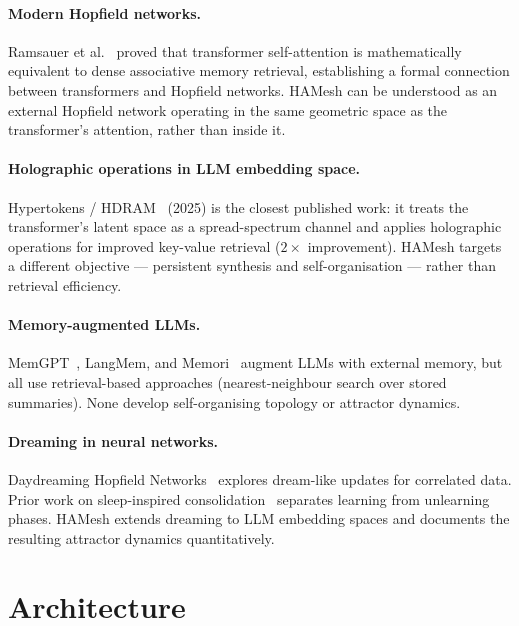 \documentclass[11pt]{article}
\begin{document}
\paragraph{Modern Hopfield networks.}
Ramsauer et al.~\cite{ramsauer2020} proved that transformer self-attention is
mathematically equivalent to dense associative memory retrieval, establishing a
formal connection between transformers and Hopfield networks. HAMesh can be
understood as an external Hopfield network operating in the same geometric space
as the transformer's attention, rather than inside it.

\paragraph{Holographic operations in LLM embedding space.}
Hypertokens / HDRAM~\cite{augeri2025} (2025) is the closest published work: it
treats the transformer's latent space as a spread-spectrum channel and applies
holographic operations for improved key-value retrieval ($2\times$ improvement).
HAMesh targets a different objective --- persistent synthesis and
self-organisation --- rather than retrieval efficiency.

\paragraph{Memory-augmented LLMs.}
MemGPT~\cite{packer2023}, LangMem, and Memori~\cite{borro2026} augment LLMs
with external memory, but all use retrieval-based approaches (nearest-neighbour
search over stored summaries). None develop self-organising topology or
attractor dynamics.

\paragraph{Dreaming in neural networks.}
Daydreaming Hopfield Networks~\cite{serricchio2025} explores dream-like updates
for correlated data. Prior work on sleep-inspired consolidation~\cite{tononi2003}
separates learning from unlearning phases. HAMesh extends dreaming to LLM
embedding spaces and documents the resulting attractor dynamics quantitatively.

\section{Architecture}
\end{document}
